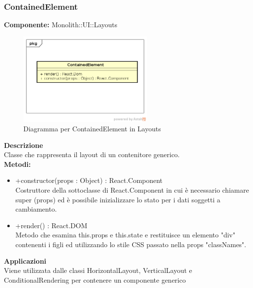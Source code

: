 \clearpage

\subsubsection{ContainedElement}
\textbf{Componente:}  Monolith::UI::Layouts\\
   \FloatBarrier
   \begin{figure}[ht]
   \centering
   \includegraphics[width=0.6\textwidth]{img/single-ContainedElement.png}
   \caption{{Diagramma per ContainedElement in Layouts}}
\end{figure}
\FloatBarrier
\textbf{Descrizione}\\
Classe che rappresenta il layout di un contenitore generico. \\
\textbf{Metodi:} 
\begin{itemize}

\item +constructor(props : Object) : React.Component 
\\
Costruttore della sottoclasse di React.Component in cui è necessario chiamare super (props) ed è possibile inizializzare lo stato per i dati soggetti a cambiamento.

\item +render() : React.DOM 
\\
Metodo che esamina this.props e this.state e restituisce un elemento "div" contenenti i figli ed utilizzando lo stile CSS passato nella props "classNames".

\end{itemize} 


\textbf{Applicazioni}\\
Viene utilizzata dalle classi HorizontalLayout, VerticalLayout e ConditionalRendering per contenere un componente generico 


\clearpage

